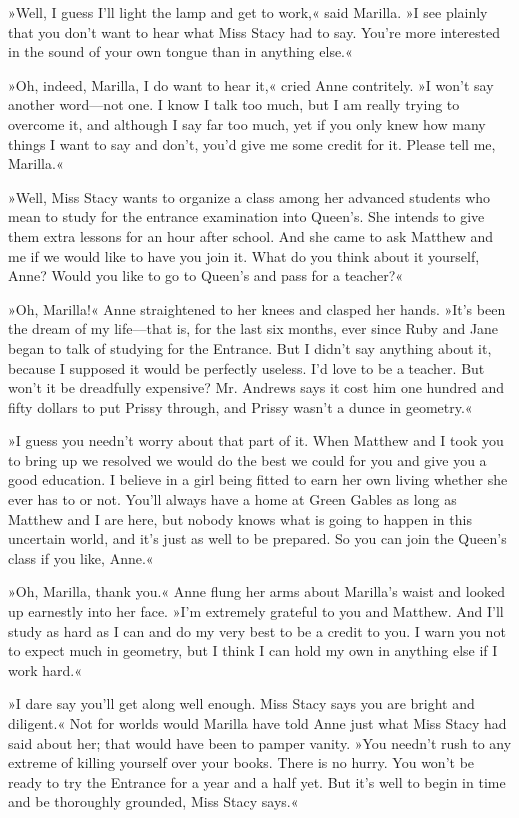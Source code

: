 »Well, I guess I'll light the lamp and get to work,« said Marilla. »I see plainly that you don't want to hear what Miss Stacy had to say. You're more interested in the sound of your own tongue than in anything else.«

»Oh, indeed, Marilla, I do want to hear it,« cried Anne contritely. »I won't say another word—not one. I know I talk too much, but I am really trying to overcome it, and although I say far too much, yet if you only knew how many things I want to say and don't, you'd give me some credit for it. Please tell me, Marilla.«

»Well, Miss Stacy wants to organize a class among her advanced students who mean to study for the entrance examination into Queen's. She intends to give them extra lessons for an hour after school. And she came to ask Matthew and me if we would like to have you join it. What do you think about it yourself, Anne? Would you like to go to Queen's and pass for a teacher?«

»Oh, Marilla!« Anne straightened to her knees and clasped her hands. »It's been the dream of my life—that is, for the last six months, ever since Ruby and Jane began to talk of studying for the Entrance. But I didn't say anything about it, because I supposed it would be perfectly useless. I'd love to be a teacher. But won't it be dreadfully expensive? Mr. Andrews says it cost him one hundred and fifty dollars to put Prissy through, and Prissy wasn't a dunce in geometry.«

»I guess you needn't worry about that part of it. When Matthew and I took you to bring up we resolved we would do the best we could for you and give you a good education. I believe in a girl being fitted to earn her own living whether she ever has to or not. You'll always have a home at Green Gables as long as Matthew and I are here, but nobody knows what is going to happen in this uncertain world, and it's just as well to be prepared. So you can join the Queen's class if you like, Anne.«

»Oh, Marilla, thank you.« Anne flung her arms about Marilla's waist and looked up earnestly into her face. »I'm extremely grateful to you and Matthew. And I'll study as hard as I can and do my very best to be a credit to you. I warn you not to expect much in geometry, but I think I can hold my own in anything else if I work hard.«

»I dare say you'll get along well enough. Miss Stacy says you are bright and diligent.« Not for worlds would Marilla have told Anne just what Miss Stacy had said about her; that would have been to pamper vanity. »You needn't rush to any extreme of killing yourself over your books. There is no hurry. You won't be ready to try the Entrance for a year and a half yet. But it's well to begin in time and be thoroughly grounded, Miss Stacy says.«

